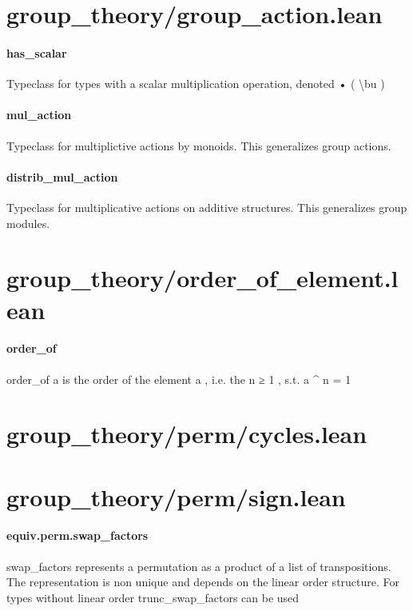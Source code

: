 \documentclass{article}
\begin{document}
\section{group\_theory/group\_action.lean}\paragraph{has\_scalar}
\par
Typeclass for types with a scalar multiplication operation, denoted 
\colorbox[RGB]{253,246,227}{{{{\color[RGB]{101, 123, 131} • }}}} (
\colorbox[RGB]{253,246,227}{{{{\color[RGB]{101, 123, 131} \textbackslash{}bu }}}})
\paragraph{mul\_action}
\par
Typeclass for multiplictive actions by monoids. This generalizes group actions.
\paragraph{distrib\_mul\_action}
\par
Typeclass for multiplicative actions on additive structures. This generalizes group modules.
\section{group\_theory/order\_of\_element.lean}\paragraph{order\_of}
\par
\colorbox[RGB]{253,246,227}{{{{\color[RGB]{101, 123, 131} order\_of a }}}} is the order of the element 
\colorbox[RGB]{253,246,227}{{{{\color[RGB]{101, 123, 131} a }}}}, i.e. the 
\colorbox[RGB]{253,246,227}{{{{\color[RGB]{101, 123, 131} n  }}}{{{\color[RGB]{181, 137, 0} ≥ }}}{{{\color[RGB]{101, 123, 131}   }}}{{{\color[RGB]{108, 113, 196} 1 }}}}, s.t. 
\colorbox[RGB]{253,246,227}{{{{\color[RGB]{101, 123, 131} a \textasciicircum{} n  }}}{{{\color[RGB]{181, 137, 0} = }}}{{{\color[RGB]{101, 123, 131}   }}}{{{\color[RGB]{108, 113, 196} 1 }}}}\section{group\_theory/perm/cycles.lean}\section{group\_theory/perm/sign.lean}\paragraph{equiv.perm.swap\_factors}
\par
\colorbox[RGB]{253,246,227}{{{{\color[RGB]{101, 123, 131} swap\_factors }}}} represents a permutation as a product of a list of transpositions.
The representation is non unique and depends on the linear order structure.
For types without linear order 
\colorbox[RGB]{253,246,227}{{{{\color[RGB]{101, 123, 131} trunc\_swap\_factors }}}} can be used
\end{document}
